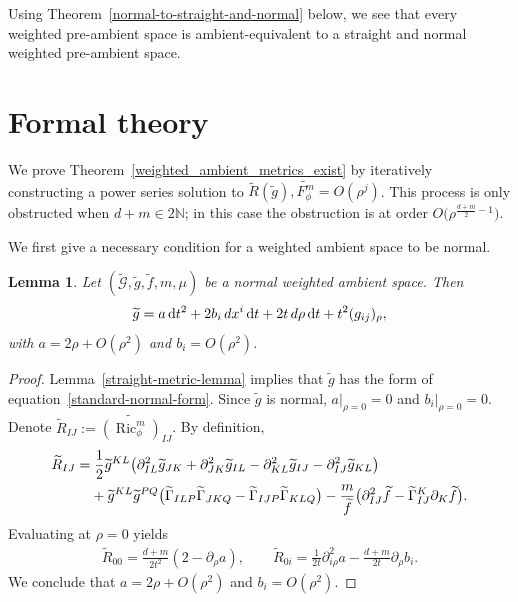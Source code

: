 \documentclass[11pt]{article}
\numberwithin{equation}{section}
\DeclareMathOperator{\Ric}{Ric}
\newcommand{\ric}{\Ric_{\phi}^m}
\numberwithin{equation}{section}
\newtheorem{Lemma}[Theorem]{Lemma}
\begin{document}
Using Theorem~\ref{normal-to-straight-and-normal} below, we see that every weighted pre-ambient space is ambient-equivalent to a straight and normal weighted pre-ambient space.



\section{Formal theory}\label{formal-theory}

We prove Theorem~\ref{weighted_ambient_metrics_exist} by iteratively constructing a power series solution to $\widetilde{R}(\widetilde{g}),\widetilde{F_\phi^m}=O(\rho^j)$. This process is only obstructed when $d+m\in 2\mathbb{N}$; in this case the obstruction is at order $O\big(\rho^{\frac{d+m}{2}-1}\big)$.

We first give a necessary condition for a weighted ambient space to be normal.

\begin{Lemma}\label{ambient-metric-base-case}
Let $(\widetilde{\mathcal{G}},\widetilde{g},\widetilde{f},m,\mu)$ be a normal weighted ambient space. Then \begin{equation}\label{standard-normal-form}\widetilde{g}=a\,\mathrm{d}t^2+2b_i\, {\rm d}x^i \,\mathrm{d}t+ 2t\,{\rm d}\rho\, \mathrm{d}t+ t^2 (g_{ij})_\rho,\end{equation} with $a=2\rho+O(\rho^2)$ and $b_i=O(\rho^2)$.
\end{Lemma}

\begin{proof}
Lemma~\ref{straight-metric-lemma} implies that $\widetilde{g}$ has the form of equation~\eqref{standard-normal-form}. Since $\widetilde{g}$ is normal, $a|_{\rho=0}=0$ and $b_i|_{\rho=0}=0$. Denote $\widetilde{R}_{IJ}:=\widetilde{(\ric)}_{IJ}$.
By definition,
\begin{gather*}
\begin{split}
&\widetilde{R}_{IJ}=\frac{1}{2}\widetilde{g}^{KL}\big(\partial^2_{IL}\widetilde{g}_{JK} +\partial^2_{JK}\widetilde{g}_{IL}-\partial^2_{KL}\widetilde{g}_{IJ}-\partial^2_{IJ}\widetilde{g}_{KL}\big)
\\ &\hphantom{\widetilde{R}_{IJ}=}
{}+\widetilde{g}^{KL}\widetilde{g}^{PQ}\big(\widetilde{\Gamma}_{ILP}\widetilde{\Gamma}_{JKQ} -\widetilde{\Gamma}_{IJP}\widetilde{\Gamma}_{KLQ}\big)
-\frac{m}{\widetilde{f}}\big(\partial^2_{IJ}\widetilde{f} -\widetilde{\Gamma}^K_{IJ}\partial_K\widetilde{f}\big).
\end{split}
\end{gather*}
Evaluating at $\rho=0$ yields
\begin{gather*}
\widetilde{R}_{00}= \frac{d+m}{2t^2}(2-\partial_{\rho}a),
\qquad
\widetilde{R}_{0i}=\frac{1}{2t}\partial^2_{i\rho}a -\frac{d+m}{2t}\partial_{\rho}b_i.
\end{gather*}
We conclude that $a=2\rho+O(\rho^2)$ and $b_i=O(\rho^2)$.
\end{proof}
\end{document}
